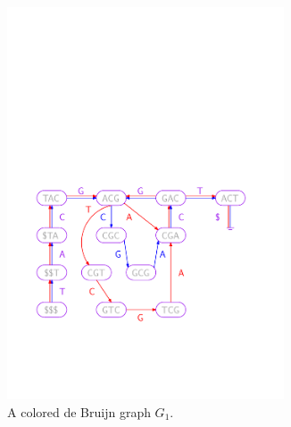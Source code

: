\begin{figure}[h!]
\begin{subfigure}[c]{0.5\textwidth}
        \includegraphics[width=0.9\textwidth]{purplegraph.pdf}
        \caption{A colored de Bruijn graph $G_1$.}
        \label{fig:g1}
    \end{subfigure}
\begin{subfigure}[c]{0.4\textwidth}

\end{subfigure}
\end{figure}
